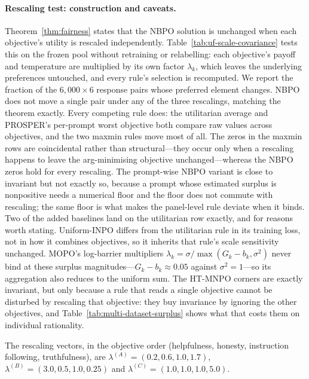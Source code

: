 \documentclass{article}
\theoremstyle{remark}
\theoremstyle{plain}
\newcommand{\NBPO}{\textsc{NBPO}}
\begin{document}
\paragraph{Rescaling test: construction and caveats.}
Theorem~\ref{thm:fairness} states that the \NBPO{} solution is unchanged when each objective's utility is rescaled independently. Table~\ref{tab:uf-scale-covariance} tests this on the frozen pool without retraining or relabelling: each objective's payoff and temperature are multiplied by its own factor $\lambda_k$, which leaves the underlying preferences untouched, and every rule's selection is recomputed. We report the fraction of the $6{,}000\times 6$ response pairs whose preferred element changes. \NBPO{} does not move a single pair under any of the three rescalings, matching the theorem exactly. Every competing rule does: the utilitarian average and PROSPER's per-prompt worst objective both compare raw values across objectives, and the two maxmin rules move most of all. The zeros in the maxmin rows are coincidental rather than structural---they occur only when a rescaling happens to leave the arg-minimising objective unchanged---whereas the \NBPO{} zeros hold for every rescaling. The prompt-wise \NBPO{} variant is close to invariant but not exactly so, because a prompt whose estimated surplus is nonpositive needs a numerical floor and the floor does not commute with rescaling; the same floor is what makes the panel-level rule deviate when it binds. Two of the added baselines land on the utilitarian row exactly, and for reasons worth stating. Uniform-INPO differs from the utilitarian rule in its training loss, not in how it combines objectives, so it inherits that rule's scale sensitivity unchanged. MOPO's log-barrier multipliers $\lambda_k = \sigma/\max(G_k - b_k, \sigma^2)$ never bind at these surplus magnitudes---$G_k - b_k \approx 0.05$ against $\sigma^2 = 1$---so its aggregation also reduces to the uniform sum. The HT-MNPO corners are exactly invariant, but only because a rule that reads a single objective cannot be disturbed by rescaling that objective: they buy invariance by ignoring the other objectives, and Table~\ref{tab:multi-dataset-surplus} shows what that costs them on individual rationality.


The rescaling vectors, in the objective order (helpfulness, honesty, instruction following, truthfulness), are $\lambda^{(A)}=(0.2,0.6,1.0,1.7)$, $\lambda^{(B)}=(3.0,0.5,1.0,0.25)$ and $\lambda^{(C)}=(1.0,1.0,1.0,5.0)$.
\end{document}
